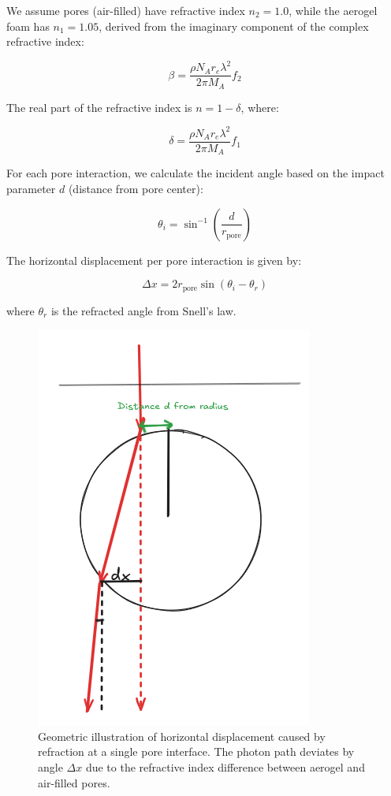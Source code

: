 \documentclass[twocolumn]{aastex701}
\begin{document}
We assume pores (air-filled) have refractive index $n_2 = 1.0$, while the aerogel foam has $n_1 = 1.05$, derived from the imaginary component of the complex refractive index:

\begin{equation}
\label{eq: f2 to beta}
    \beta = \frac{\rho N_A r_e \lambda^2}{2\pi M_A} f_2
\end{equation}

The real part of the refractive index is $n = 1 - \delta$, where:

\begin{equation}
\delta = \frac{\rho N_A r_e \lambda^2}{2\pi M_A} f_1
\end{equation}

For each pore interaction, we calculate the incident angle based on the impact parameter $d$ (distance from pore center):

\begin{equation}
\theta_i = \sin^{-1}\left(\frac{d}{r_{\text{pore}}}\right)
\end{equation}

The horizontal displacement per pore interaction is given by:

\begin{equation}
\label{eq:horizontal displacements}
\Delta x = 2r_{\text{pore}} \sin(\theta_i - \theta_r)
\end{equation}

where $\theta_r$ is the refracted angle from Snell's law.

\begin{figure}[t]
    \centering
    \includegraphics[width=0.45\linewidth]{zoomedindx.png}
    \caption{Geometric illustration of horizontal displacement caused by refraction at a single pore interface. The photon path deviates by angle $\Delta x$ due to the refractive index difference between aerogel and air-filled pores.}
    \label{fig:dxzoom}
\end{figure}
\end{document}
